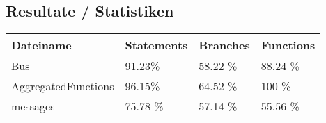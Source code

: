 \documentclass[qualitaetssicherung.tex]{subfiles}
\begin{document}
\subsection*{Resultate / Statistiken}
\begin{center}
    \begin{tabular}{| l | l | l | l |}
    \hline
    Dateiname & Statements & Branches & Functions \\ \hline
    	Bus & 91.23\% & 58.22 \% & 88.24 \% \\ \hline
		AggregatedFunctions & 96.15\% & 64.52 \% & 100 \% \\ \hline
		messages & 75.78 \% & 57.14 \% & 55.56 \% \\
    \hline
    \end{tabular}
\end{center}
\end{document}
